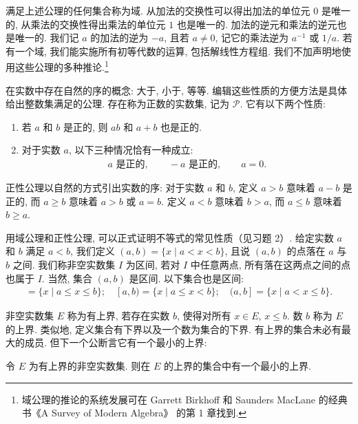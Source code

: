 \documentclass[../../main.tex]{subfiles}
\begin{document}
满足上述公理的任何集合称为域. 从加法的交换性可以得出加法的单位元 $0$ 是唯一的, 从乘法的交换性得出乘法的单位元 $1$ 也是唯一的. 加法的逆元和乘法的逆元也是唯一的. 我们记 $a$ 的加法的逆为 $-a$, 且若 $a\neq 0$, 记它的乘法逆为 $a^{-1}$ 或 $1/a$. 若有一个域, 我们能实施所有初等代数的运算, 包括解线性方程组. 我们不加声明地使用这些公理的多种推论.\footnote{域公理的推论的系统发展可在 Garrett Birkhoff 和 Saunders MacLane 的经典书《A Survey of Modern Algebra》\cite{BM97} 的第 1 章找到.}

\begin{definition}[正性公理]\label{definition:ch01-正性公理}
在实数中存在自然的序的概念: 大于, 小于, 等等. 编辑这些性质的方便方法是具体给出整数集满足的公理. 存在称为正数的实数集, 记为 $\mathcal{P}$. 它有以下两个性质:
\begin{enumerate}[(P1)]
\item 若 $a$ 和 $b$ 是正的, 则 $ab$ 和 $a+b$ 也是正的.
\item 对于实数 $a$, 以下三种情况恰有一种成立:
\begin{align*}
a\text{ 是正的},\qquad -a\text{ 是正的},\qquad a=0.
\end{align*}
\end{enumerate}
\end{definition}

正性公理以自然的方式引出实数的序: 对于实数 $a$ 和 $b$, 定义 $a>b$ 意味着 $a-b$ 是正的, 而 $a\geqslant b$ 意味着 $a>b$ 或 $a=b$. 定义 $a<b$ 意味着 $b>a$, 而 $a\leqslant b$ 意味着 $b\geqslant a$.

用域公理和正性公理, 可以正式证明不等式的常见性质（见习题 2）. 给定实数 $a$ 和 $b$ 满足 $a<b$, 我们定义 $(a,b)=\{x\mid a<x<b\}$, 且说 $(a,b)$ 的点落在 $a$ 与 $b$ 之间. 我们称非空实数集 $I$ 为区间, 若对 $I$ 中任意两点, 所有落在这两点之间的点也属于 $I$. 当然, 集合 $(a,b)$ 是区间. 以下集合也是区间:
\begin{align}
[a,b]=\{x\mid a\leqslant x\leqslant b\};\quad [a,b)=\{x\mid a\leqslant x<b\};\quad (a,b]=\{x\mid a<x\leqslant b\}.\label{align:ch01-区间}
\end{align}

\begin{definition}[完备性公理]\label{definition:ch01-完备性公理}
非空实数集 $E$ 称为有上界, 若存在实数 $b$, 使得对所有 $x\in E$, $x\leqslant b$. 数 $b$ 称为 $E$ 的上界. 类似地, 定义集合有下界以及一个数为集合的下界. 有上界的集合未必有最大的成员. 但下一个公断言它有一个最小的上界:

令 $E$ 为有上界的非空实数集. 则在 $E$ 的上界的集合中有一个最小的上界.
\end{definition}
\end{document}
